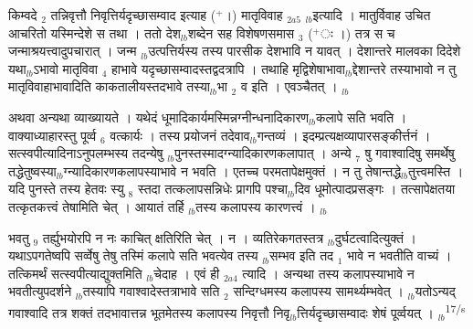\documentclass[article,12pt,a4paper]{memoir}%
\newcommand{\add}[1]{($^{+}$#1)}
\newcounter{parCount}
\begin{document}
	  
	  \pstart \leavevmode%
	किम्वदे {\tiny $_{2}$} तन्निवृत्तौ निवृत्तिर्यदृच्छासम्वाद इत्याह \add{।} {\color{DodgerBlue3}मातृविवाह} {\tiny $_{2a5}$} {\tiny $_{lb}$}इत्यादि । मातुर्विवाह उचित आचरितो यस्मिन्देशे स तथा । ततो देश{\tiny $_{lb}$}शब्देन सह विशेषणसमास {\tiny $_{3}$} \add{ः ।} तत्र स च जन्माश्रयत्त्वादुपचारात् । जन्म {\tiny $_{lb}$}उत्पत्तिर्यस्य तस्य {\color{DodgerBlue3}पारसीक} देशभावि न यावत् । देशान्तरे {\color{DodgerBlue3}मालवका} दिदेशे यथा{\tiny $_{lb}$}ऽभावो मातृविवा {\tiny $_{4}$} हाभावे यदृच्छासम्वादस्तद्वदत्रापि । तथाहि मृद्विशेषाभावा{\tiny $_{lb}$}द्देशान्तरे तस्याभावो न तु मातृविवाहाभावादिति काकतालीयस्तदभावे तस्या{\tiny $_{lb}$}भा {\tiny $_{2}$} व इति । एवञ्चैतत् ।
	{}
	\pend%
      {\tiny $_{lb}$}

	  
	  \pstart \leavevmode%
	अथवा अन्यथा व्याख्यायते । यथेदं धूमादिकार्यमस्मिन्नग्नीन्धनादिकारण{\tiny $_{lb}$}कलापे सति भवति । वाक्याध्याहारस्तु पूर्व्व {\tiny $_{6}$} वत्कार्यः । तस्य प्रयोजनं तदेवाव{\tiny $_{lb}$}गन्तव्यं । इदम्प्रत्यक्षव्यापारसङ्कीर्त्तनं । सत्स्वपीत्यादिनाऽनुपलम्भस्य तदन्येषु {\tiny $_{lb}$}पुनस्तस्मादग्न्यादिकारणकलापात् । अन्ये {\tiny $_{7}$} षु गवाश्वादिषु समर्थेषु तद्धेतुष्वस्या{\tiny $_{lb}$}ग्न्यादिकारणकलापस्याभावे न भवति । एतच्च परमतापेक्षमुक्तं । न तु तेषान्तद्धे{\tiny $_{lb}$}तुत्त्वमस्ति । यदि पुनस्ते तस्य हेतवः स्यु {\tiny $_{8}$} स्तदा तत्कलापसन्निधेः प्रागपि पश्चा{\tiny $_{lb}$}दिव धूमोत्पादप्रसङ्गः । तत्सापेक्षतया तत्कृतकत्त्वं तेषामिति चेत् । आयातं तर्हि {\tiny $_{lb}$}तस्य कलापस्य कारणत्त्वं ।
	{}
	\pend%
      {\tiny $_{lb}$}

	  
	  \pstart \leavevmode%
	भवतु {\tiny $_{9}$}\leavevmode{} तर्ह्युभयोरपि न नः काचित् क्षतिरिति चेत् । न । व्यतिरेकगतस्तत्र {\tiny $_{lb}$}दुर्घटत्वादित्युक्तं । यथाऽपगतेष्वपि सर्व्वेषु तेषु तस्मिं कलापे सति भवत्येव तस्य {\tiny $_{lb}$}सम्भव इति तद {\tiny $_{1}$} भावे न भवतीति वाच्यं । तत्किमर्थं सत्स्वपीत्याद्युक्तमिति {\tiny $_{lb}$}चेदाह । {\color{DodgerBlue3}एवं ही {\tiny $_{2a4}$} त्यादि} । अन्यथा तस्य कलापस्याभावे न भवतीत्युपदर्शने {\tiny $_{lb}$}तस्यापि गवाश्वादेस्तत्राभावे सति {\tiny $_{2}$} सन्दिग्धमस्य कलापस्य सामर्थ्यम्भवेत् । {\tiny $_{lb}$}यतोऽन्यद् गवाश्वादि तत्र शक्तं तदभावात्तन्न भूतमेतस्य कलापस्य निवृत्तौ निवृ{\tiny $_{lb}$}त्तिर्यदृच्छासम्वादः शेषं पूर्व्वयत् ।
	{}
	\pend%
      {\tiny $_{lb}$}\textsuperscript{\textenglish{17/s}}
\end{document}
